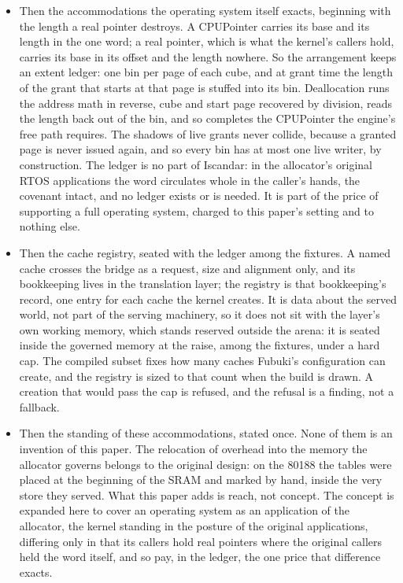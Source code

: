 \documentclass[11pt]{article}
\begin{document}
\begin{itemize}
\item Then the accommodations the operating system itself exacts, beginning with the length a real pointer destroys. A CPUPointer carries its base and its length in the one word; a real pointer, which is what the kernel's callers hold, carries its base in its offset and the length nowhere. So the arrangement keeps an extent ledger: one bin per page of each cube, and at grant time the length of the grant that starts at that page is stuffed into its bin. Deallocation runs the address math in reverse, cube and start page recovered by division, reads the length back out of the bin, and so completes the CPUPointer the engine's free path requires. The shadows of live grants never collide, because a granted page is never issued again, and so every bin has at most one live writer, by construction. The ledger is no part of Iscandar: in the allocator's original RTOS applications the word circulates whole in the caller's hands, the covenant intact, and no ledger exists or is needed. It is part of the price of supporting a full operating system, charged to this paper's setting and to nothing else.
\item Then the cache registry, seated with the ledger among the fixtures. A named cache crosses the bridge as a request, size and alignment only, and its bookkeeping lives in the translation layer; the registry is that bookkeeping's record, one entry for each cache the kernel creates. It is data about the served world, not part of the serving machinery, so it does not sit with the layer's own working memory, which stands reserved outside the arena: it is seated inside the governed memory at the raise, among the fixtures, under a hard cap. The compiled subset fixes how many caches Fubuki's configuration can create, and the registry is sized to that count when the build is drawn. A creation that would pass the cap is refused, and the refusal is a finding, not a fallback.
\item Then the standing of these accommodations, stated once. None of them is an invention of this paper. The relocation of overhead into the memory the allocator governs belongs to the original design: on the 80188 the tables were placed at the beginning of the SRAM and marked by hand, inside the very store they served. What this paper adds is reach, not concept. The concept is expanded here to cover an operating system as an application of the allocator, the kernel standing in the posture of the original applications, differing only in that its callers hold real pointers where the original callers held the word itself, and so pay, in the ledger, the one price that difference exacts.

\end{itemize}
\end{document}
